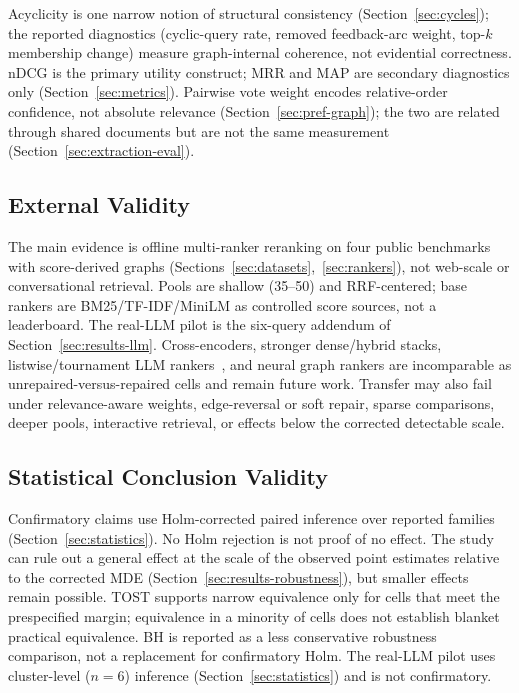 \documentclass[pdflatex,sn-basic,Numbered]{sn-jnl}
\begin{document}
Acyclicity is one narrow notion of structural consistency
(Section~\ref{sec:cycles}); the reported diagnostics (cyclic-query rate,
removed feedback-arc weight, top-$k$ membership change) measure
graph-internal coherence, not evidential correctness. nDCG is the primary
utility construct; MRR and MAP are secondary diagnostics only
(Section~\ref{sec:metrics}). Pairwise vote weight encodes relative-order
confidence, not absolute relevance
(Section~\ref{sec:pref-graph}); the two are related through shared documents
but are not the same measurement
(Section~\ref{sec:extraction-eval}).

\subsection{External Validity}
\label{sec:limitations-external}

The main evidence is offline multi-ranker reranking on four public
benchmarks with score-derived graphs
(Sections~\ref{sec:datasets},~\ref{sec:rankers}), not web-scale or
conversational retrieval. Pools are shallow (35--50) and RRF-centered;
base rankers are BM25/TF-IDF/MiniLM as controlled score sources, not a
leaderboard. The real-LLM pilot is the six-query addendum of
Section~\ref{sec:results-llm}. Cross-encoders, stronger dense/hybrid
stacks, listwise/tournament LLM
rankers~\cite{chen2025tourrank,pradeep2023rankzephyr}, and neural graph
rankers are incomparable as unrepaired-versus-repaired cells and remain
future work. Transfer may also fail under relevance-aware weights,
edge-reversal or soft repair, sparse comparisons, deeper pools,
interactive retrieval, or effects below the corrected detectable scale.

\subsection{Statistical Conclusion Validity}
\label{sec:limitations-statistical}

Confirmatory claims use Holm-corrected paired inference over reported
families (Section~\ref{sec:statistics}). No Holm rejection is not proof of
no effect. The study can rule out a general effect at the scale of the
observed point estimates relative to the corrected MDE
(Section~\ref{sec:results-robustness}), but smaller effects remain
possible. TOST supports narrow equivalence only for cells that meet the
prespecified margin; equivalence in a minority of cells does not establish
blanket practical equivalence. BH is reported as a less conservative
robustness comparison, not a replacement for confirmatory Holm. The
real-LLM pilot uses cluster-level ($n=6$) inference
(Section~\ref{sec:statistics}) and is not confirmatory.
\end{document}
